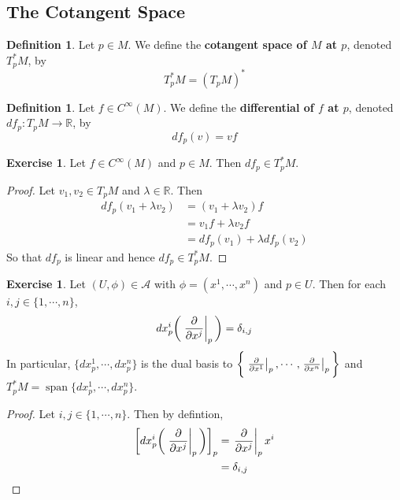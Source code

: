 \documentclass[12pt]{amsart}
\theoremstyle{definition}
\newtheorem{defn}[definition]{Definition}
\newtheorem{ex}[definition]{Exercise}
\newcommand{\del}{\delta}
\newcommand{\lam}{\lambda}
\newcommand{\R}{\mathbb{R}}
\newcommand{\MA}{\mathcal{A}}
\DeclareMathOperator{\spn}{span}
\begin{document}
	
	
	
	
	
	
	
	
	
	
	
	
	
	
	\newpage
	\subsection{The Cotangent Space}	
	
	
	\begin{defn}
	Let $p \in M$. We define the \textbf{cotangent space of $M$ at $p$}, denoted $T^*_pM$, by $$T^*_pM = (T_pM)^*$$
	\end{defn}
	
	\begin{defn}
	Let $f \in C^{\infty}(M)$. We define the \textbf{differential of $f$ at $p$}, denoted $df_p:T_pM \rightarrow \R$, by $$df_p(v) = vf$$
	\end{defn}
	
	\begin{ex}
	Let $f \in C^{\infty}(M)$ and $p \in M$. Then $df_p \in T^*_pM$.
	\end{ex}
	
	\begin{proof}
	Let $v_1, v_2 \in T_pM$ and $\lam \in \R$. Then 
	\begin{align*}
	df_p(v_1 + \lam v_2) 
	&= (v_1 + \lam v_2) f \\
	&= v_1 f + \lam v_2 f \\
	&= df_p(v_1) + \lam df_p(v_2)
	\end{align*}
	So that $df_p$ is linear and hence $df_p \in T^*_pM$.
	\end{proof}
	
	\begin{ex}
		Let $(U, \phi) \in \MA$ with $\phi = (x^1, \cdots, x^n)$ and $p \in U$. Then for each $i,j \in \{1, \cdots, n\}$, $$dx^i_p \bigg(\eval{\pdv{x^j}}_p \bigg) = \del_{i,j}$$ 
		In particular, $\{dx^1_p, \cdots, dx^n_p \}$ is the dual basis to $\bigg \{ \eval{\pdv{x^1}}_{p}, \cdots, \eval{\pdv{x^n}}_{p} \bigg \}$ and $T_p^*M = \spn\{dx^1_p, \cdots, dx^n_p\}$.
	\end{ex}

	\begin{proof}
		Let $i,j \in \{1, \cdots, n\}$. Then  by defintion,
		\begin{align*}
			\bigg[ dx^i_p \bigg (\eval{\pdv{x^j}}_{p} \bigg ) \bigg]_p 
			&= \eval{\pdv{x^j}}_{p} x^i \\
			&= \del_{i,j} \\
		\end{align*}
	\end{proof}
	
\end{document}
